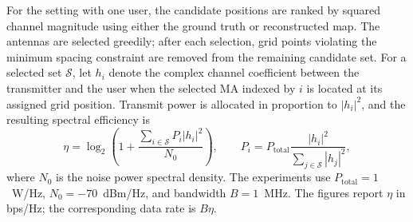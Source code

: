 \documentclass[lettersize,journal]{IEEEtran}
\begin{document}
For the setting with one user, the candidate positions are ranked by squared channel magnitude using either the ground truth or reconstructed map. The antennas are selected greedily; after each selection, grid points violating the minimum spacing constraint are removed from the remaining candidate set. For a selected set $\mathcal{S}$, let $h_i$ denote the complex channel coefficient between the transmitter and the user when the selected MA indexed by $i$ is located at its assigned grid position. Transmit power is allocated in proportion to $|h_i|^2$, and the resulting spectral efficiency is
\begin{equation}
	\eta=\log_2\!\left(1+
	\frac{\sum_{i\in\mathcal{S}}P_i|h_i|^2}{N_0}\right),
	\qquad
	P_i=P_{\mathrm{total}}
	\frac{|h_i|^2}{\sum_{j\in\mathcal{S}}|h_j|^2},
	\label{eq:ma_rate}
\end{equation}
where $N_0$ is the noise power spectral density. The experiments use $P_{\mathrm{total}}=1$~W/Hz, $N_0=-70$~dBm/Hz, and bandwidth $B=1$~MHz. The figures report $\eta$ in bps/Hz; the corresponding data rate is $B\eta$.
\end{document}

